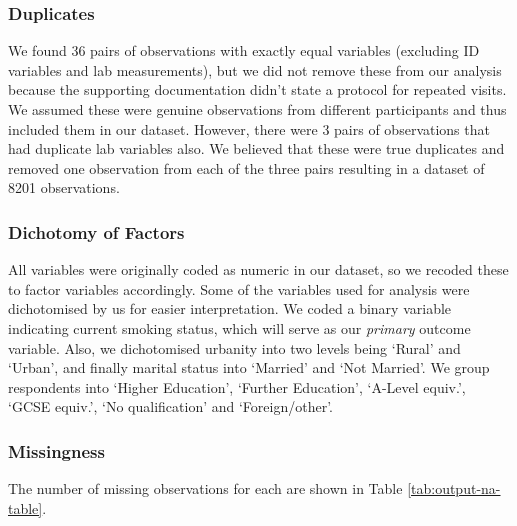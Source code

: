\documentclass[
  11pt,
  twocolumn]{article}
\begin{document}
\hypertarget{duplicates}{%
\subsubsection{Duplicates}\label{duplicates}}

We found 36 pairs of observations with exactly equal variables
(excluding ID variables and lab measurements), but we did not remove
these from our analysis because the supporting documentation didn't
state a protocol for repeated visits. We assumed these were genuine
observations from different participants and thus included them in our
dataset. However, there were 3 pairs of observations that had duplicate
lab variables also. We believed that these were true duplicates and
removed one observation from each of the three pairs resulting in a
dataset of 8201 observations.

\hypertarget{dichotomy-of-factors}{%
\subsubsection{Dichotomy of Factors}\label{dichotomy-of-factors}}

All variables were originally coded as numeric in our dataset, so we
recoded these to factor variables accordingly. Some of the variables
used for analysis were dichotomised by us for easier interpretation. We
coded a binary variable indicating current smoking status, which will
serve as our \emph{primary} outcome variable. Also, we dichotomised
urbanity into two levels being `Rural' and `Urban', and finally marital
status into `Married' and `Not Married'. We group respondents into
`Higher Education', `Further Education', `A-Level equiv.', `GCSE
equiv.', `No qualification' and `Foreign/other'.

\hypertarget{missingness}{%
\subsubsection{Missingness}\label{missingness}}

The number of missing observations for each are shown in Table
\ref{tab:output-na-table}.
\end{document}
